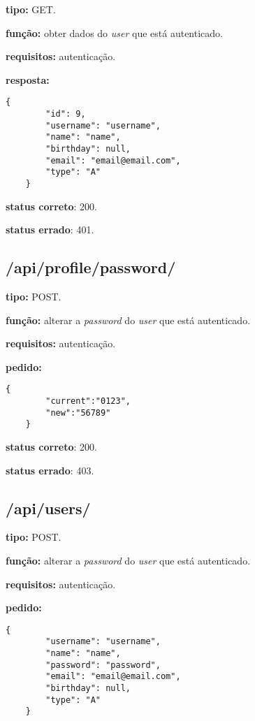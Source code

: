 \documentclass[11pt,a4paper]{report}
\begin{document}
\textbf{tipo:} GET.

\textbf{função:} obter dados do \emph{user} que está autenticado.

\textbf{requisitos:} autenticação.

\textbf{resposta:}

\begin{lstlisting}[style = code]
    {
        "id": 9,
        "username": "username",
        "name": "name",
        "birthday": null,
        "email": "email@email.com",
        "type": "A"
    }
\end{lstlisting}

\textbf{status correto}: 200.

\textbf{status errado}: 401.

\subsection{/api/profile/password/}

\textbf{tipo:} POST.

\textbf{função:} alterar a \emph{password} do \emph{user} que está autenticado.

\textbf{requisitos:} autenticação.

\textbf{pedido:}

\begin{lstlisting}[style = code]
   {
        "current":"0123",
        "new":"56789"
    }
\end{lstlisting}

\textbf{status correto}: 200.

\textbf{status errado}: 403.

\newpage

\subsection{/api/users/}

\textbf{tipo:} POST.

\textbf{função:} alterar a \emph{password} do \emph{user} que está autenticado.

\textbf{requisitos:} autenticação.

\textbf{pedido:}

\begin{lstlisting}[style = code]
   {
        "username": "username",
        "name": "name",
        "password": "password",
        "email": "email@email.com",
        "birthday": null,
        "type": "A"
    }
\end{lstlisting}
\end{document}
